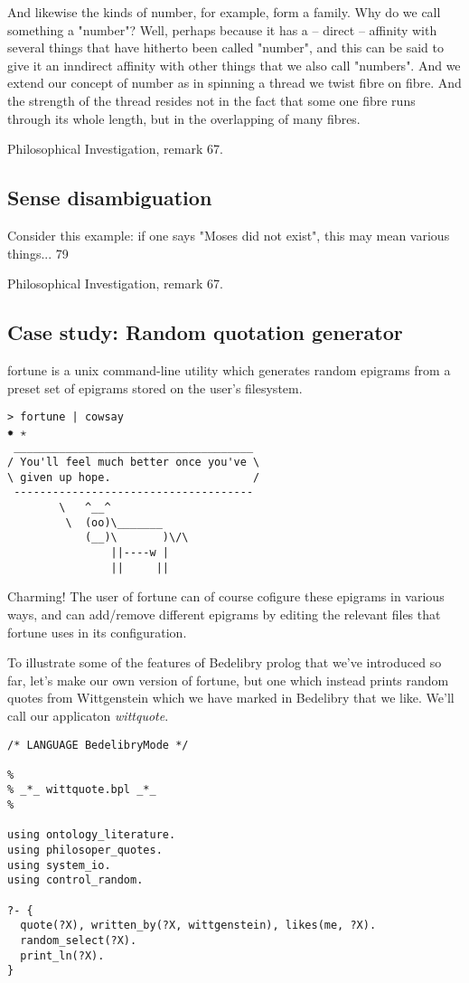 \documentclass{book}
\begin{document}
\epigraph{And likewise the kinds of number, for example, form a family. Why do we call something a "number"? Well, perhaps because it has a -- direct -- affinity with several things that have hitherto been called "number", and this can be said to give it an inndirect affinity with other things that we also call "numbers". And we extend our concept of number as in spinning a thread we twist fibre on fibre. And the strength of the thread resides not in the fact that some one fibre runs through its whole length, but in the overlapping of many fibres.}{Philosophical Investigation, remark 67.}

\subsection{Sense disambiguation}

\epigraph{Consider this example: if one says "Moses did not exist", this may mean various things... 79}{Philosophical Investigation, remark 67.}

\subsection{Case study: Random quotation generator}

fortune is a unix command-line utility which generates random epigrams from a preset set of epigrams stored on the user's filesystem. 

\begin{verbatim}
> fortune | cowsay                                                                                                                                                                                             ✹ ✭
 _____________________________________
/ You'll feel much better once you've \
\ given up hope.                      /
 -------------------------------------
        \   ^__^
         \  (oo)\_______
            (__)\       )\/\
                ||----w |
                ||     ||
\end{verbatim}

\noindent Charming! The user of fortune can of course cofigure these epigrams in various ways, and can add/remove different epigrams by editing the relevant files that fortune uses in its configuration.

To illustrate some of the features of Bedelibry prolog that we've introduced so far, let's make our own version of fortune, but one which instead prints random quotes from Wittgenstein which we have marked in Bedelibry that we like. We'll call our applicaton \textit{wittquote}.

\begin{verbatim}
/* LANGUAGE BedelibryMode */

%
% _*_ wittquote.bpl _*_
%

using ontology_literature.
using philosoper_quotes.
using system_io.
using control_random.

?- {
  quote(?X), written_by(?X, wittgenstein), likes(me, ?X).
  random_select(?X). 
  print_ln(?X).
}
\end{verbatim}
\end{document}
